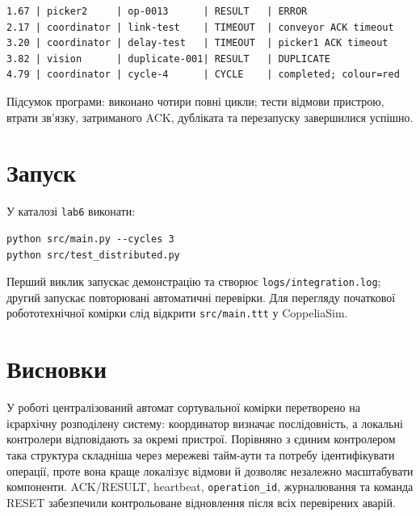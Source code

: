 \documentclass[12pt,a4paper]{article}
\begin{document}
\begin{lstlisting}[caption={Фрагмент журналу тестування}]
1.67 | picker2     | op-0013      | RESULT   | ERROR
2.17 | coordinator | link-test    | TIMEOUT  | conveyor ACK timeout
3.20 | coordinator | delay-test   | TIMEOUT  | picker1 ACK timeout
3.82 | vision      | duplicate-001| RESULT   | DUPLICATE
4.79 | coordinator | cycle-4      | CYCLE    | completed; colour=red
\end{lstlisting}

Підсумок програми: виконано чотири повні цикли; тести відмови пристрою,
втрати зв'язку, затриманого ACK, дубліката та перезапуску завершилися
успішно.

\section{Запуск}
У каталозі \texttt{lab6} виконати:
\begin{lstlisting}[numbers=none,language={}]
python src/main.py --cycles 3
python src/test_distributed.py
\end{lstlisting}
Перший виклик запускає демонстрацію та створює
\texttt{logs/integration.log}; другий запускає повторювані автоматичні
перевірки. Для перегляду початкової робототехнічної комірки слід відкрити
\texttt{src/main.ttt} у CoppeliaSim.

\section{Висновки}
У роботі централізований автомат сортувальної комірки перетворено на
ієрархічну розподілену систему: координатор визначає послідовність, а
локальні контролери відповідають за окремі пристрої. Порівняно з єдиним
контролером така структура складніша через мережеві тайм-аути та потребу
ідентифікувати операції, проте вона краще локалізує відмови й дозволяє
незалежно масштабувати компоненти. ACK/RESULT, heartbeat,
\texttt{operation\_id}, журналювання та команда RESET забезпечили
контрольоване відновлення після всіх перевірених аварій.
\end{document}
